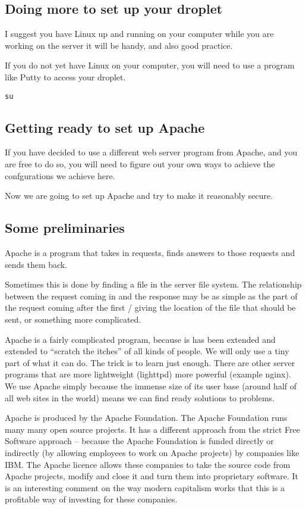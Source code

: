 \documentclass[12pt, a4paper]{article}
\begin{document}
\subsection*{Doing more to set up your droplet}


I suggest you have Linux up and running on your computer while you are working on the server  it will be handy, and also good practice.

If you do not yet have Linux on your computer, you will need to use a program like Putty to access your droplet.
\begin{verbatim}
su
\end{verbatim}


\subsection*{Getting ready to set up Apache}

If you have decided to use a different web server program from Apache, and you are free to do so, you will need to figure out your own ways to achieve the confgurations we achieve here.

Now we are going to set up Apache and try to make it reasonably secure.

\subsection*{Some preliminaries}
Apache is a program that takes in requests, finds answers to those requests and sends them back.

Sometimes this is done by finding a file in the server file system. The relationship between the request coming in and the response may be as simple as the part of the request coming after the first / giving the location of the file that should be sent, or something more complicated.

Apache is a fairly complicated program, because is has been extended and extended to “scratch the itches” of all kinds of people. We will only use a tiny part of what it can do. The trick is to learn just enough. There are other server programs that are more lightweight (lighttpd) more powerful (example nginx). We use Apache simply because the immense size of its user base (around half of all web sites in the world) means we can find ready solutions to problems.

Apache is produced by the Apache Foundation. The Apache Foundation runs many many open source projects. It has a different approach from the strict Free Software approach – because the Apache Foundation is funded directly or indirectly (by allowing employees to work on Apache projects) by companies like IBM. The Apache licence allows these companies to take the source code from Apache projects, modify and close it and turn them into proprietary software. It is an interesting comment on the way modern capitalism works that this is a profitable way of investing for these companies. 
\end{document}
